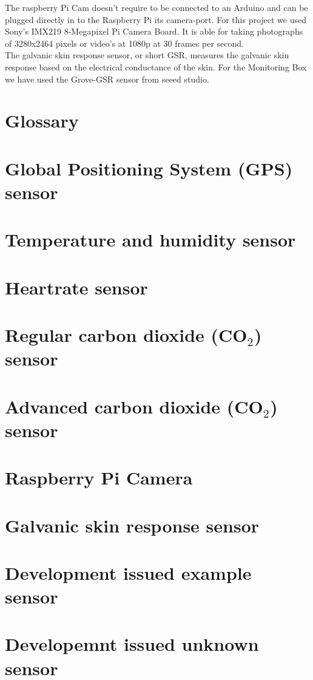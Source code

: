 \documentclass{report}
\begin{document}
The raspberry Pi Cam doesn't require to be connected to an Arduino and can be plugged directly in to the Raspberry Pi its camera-port. For this project we used Sony's IMX219 8-Megapixel Pi Camera Board. It is able for taking photographs of 3280x2464 pixels or video's at 1080p at 30 frames per second. \\

The galvanic skin response sensor, or short GSR, measures the galvanic skin response based on the electrical conductance of the skin. For the Monitoring Box we have used the Grove-GSR sensor from seeed studio.
\chapter{Glossary}

\chapter{Global Positioning System (GPS) sensor}

\chapter{Temperature and humidity sensor}

\chapter{Heartrate sensor}

\chapter{Regular carbon dioxide (CO$_2$) sensor}

\chapter{Advanced carbon dioxide (CO$_2$) sensor}

\chapter{Raspberry Pi Camera}

\chapter{Galvanic skin response sensor}

\chapter{Development issued example sensor}

\chapter{Developemnt issued unknown sensor}
\end{document}
